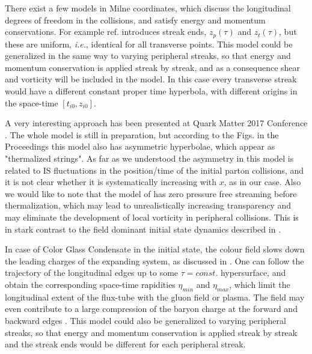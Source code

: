 \documentclass[aps,prc,twocolumn,floatfix,showpacs,a4paper,
nofootinbib,amsmath,amssymb]{revtex4-1}
\begin{document}
There exist a few models in Milne coordinates, which  discuss 
the longitudinal degrees of freedom in the collisions, and satisfy 
energy and momentum conservations. For example 
ref. \cite{Mishustin2011} introduces streak ends,
$z_p(\tau)$ and $z_t(\tau)$, but these are uniform,
{\it i.e.}, identical for all transverse points. This model could 
be generalized in the same way to varying peripheral streaks,
so that energy and momentum conservation is applied streak
by streak, and as a consequence shear and vorticity will
be included in the model. In this case every transverse
streak would have a different constant proper time
hyperbola, with different origins in the space-time
$[t_{i0}, z_{i0}]$.


A very interesting approach has been presented at Quark Matter 2017 Conference \cite{Shen:2017ruz}. The whole model is still in preparation, but according to the Figs. in the Proceedings \cite{Shen:2017ruz} this model also has asymmetric hyperbolae, which appear as "thermalized strings". As far as we understood the asymmetry in this model is related to IS fluctuations in the position/time of the initial parton collisions, and it is not clear whether it is systematically increasing with $x$, as in our case.  Also we would like to note that the model of \cite{Shen:2017ruz} has zero pressure free streaming before thermalization, which may lead to unrealistically increasing
  transparency and may eliminate the development of local vorticity
  in peripheral collisions.  This is in stark contrast to the
  field dominant initial state dynamics described in
\cite{M2001,M2002,Gy1986,MiL2012,Stoecker:2015zea}. 


In case of Color Glass Condensate in the initial state, the 
colour field slows down the leading charges of the 
expanding system, as discussed in 
\cite{FKL16,OF14,CFKL15,Fries:2017ina}.
One can follow the trajectory of the longitudinal edges up 
to some $\tau = const.$ hypersurface, and obtain the corresponding space-time rapidities 
$\eta_{min}$ and $\eta_{max}$, which limit the longitudinal 
extent of the flux-tube with the gluon field or plasma. The field
may even contribute to a large compression of the baryon charge
at the forward and backward edges
\cite{LK17,Gy1986}.
This model could also 
be generalized to varying peripheral streaks,
so that energy and momentum conservation is applied streak
by streak and the streak ends 
would be different for each peripheral streak.
\end{document}
